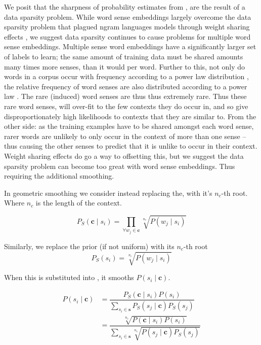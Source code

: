 \documentclass{sig-alternate}
\renewcommand{\c}{\mathbf{c}}
\newcommand{\s}{\mathbf{s}}
\begin{document}
We posit that the sharpness of probability estimates from , are the result of a data sparsity problem. While word sense embeddings largely overcome the data sparsity problem that plagued ngram languages models through weight sharing effects \textcite{NPLM}, we suggest data sparsity continues to cause problems for multiple word sense embeddings. Multiple sense word embeddings have a significantly larger set of labels to learn; the same amount of training data must be shared amounts many times more senses, than it would per word. Further to this, not only do words in a corpus occur with frequency according to a power law distribution \parencite{zipf1949human},  the relative frequency of word senses are also distributed according to a power law \parencite{Kilgarriff2004}. The rare (induced) word senses are thus thus extremely rare. Thus these rare word senses, will over-fit to the few contexts they do occur in, and so give disproportionately high likelihoods to contexts that they are similar to. From the other side: as the training examples have to be shared amongst each word sense, rarer words are unlikely to only occur in the context of more than one sense -- thus causing the other senses to predict that it is unlike to occur in their context. Weight sharing effects do go a way to offsetting this, but we suggest the data sparsity problem can become too great with word sense embeddings. Thus requiring the additional smoothing.


In geometric smoothing we consider instead replacing the, with it's $n_c$-th root.
Where $n_c$ is the length of the context.

\begin{equation} \label{eq:contrextprobsmooth}
P_S(\c \mid s_{i})=\prod_{\forall w_{j}\in\c}\sqrt[n_c]{P(w_{j} \mid s_{i})}
\end{equation}

Similarly, we replace the prior (if not uniform) with its $n_c$-th root
\begin{equation} \label{eq:priorsmoothed}
P_S(s_{i})= \sqrt[n_c]{P(w_{j} \mid s_{i})}
\end{equation}


When this is substituted into , it smooths $P(s_{i} \mid \c)$.


\begin{equation} \label{eq:generalwsdsmoothed}
\begin{aligned}
P(s_{i}\mid\c) %
&=\dfrac{P_{S}(\c\mid s_{i})P(s_{i})}
{\sum_{s_{i}\in\s} P_{S}(s_{j}\mid\c)P_S(s_{j})} \\
%
&=\dfrac{\sqrt[n_c]{P(\c\mid s_{i})P(s_{i})}}
{\sum_{s_{i}\in\s} \sqrt[n_c]{P(s_{j}\mid\c)P_S(s_{j})}} \\
%
\end{aligned}
\end{equation}
\end{document}
